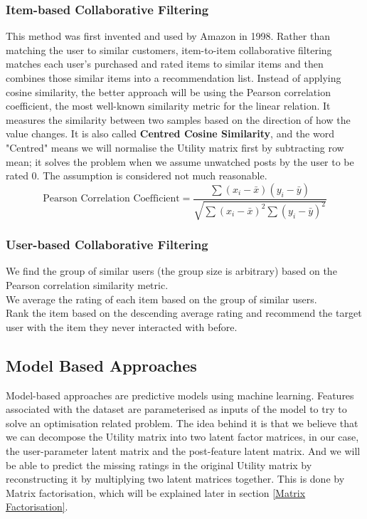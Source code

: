 \subsubsection{Item-based Collaborative Filtering}
This method was first invented and used by Amazon in 1998. 
Rather than matching the user to similar customers, item-to-item collaborative filtering matches each user’s purchased and rated items to similar items and then combines those similar items into a recommendation list.
Instead of applying cosine similarity, the better approach will be using the Pearson correlation coefficient, the most well-known similarity metric for the linear relation. It measures the similarity between two samples based on the direction of how the value changes. It is also called \textbf{Centred Cosine Similarity}, and the word "Centred" means we will normalise the Utility matrix first by subtracting row mean; it solves the problem when we assume unwatched posts by the user to be rated 0. The assumption is considered not much reasonable.
\begin{equation*}
\text{Pearson Correlation Coefficient} = \frac{\sum(x_{i} - \bar{x})(y_{i} - \bar{y})} {\sqrt{\sum(x_{i} - \bar{x})^{2} \sum{(y_{i} - \bar{y})^{2} }}}
\end{equation*}

\subsubsection{User-based Collaborative Filtering}
We find the group of similar users (the group size is arbitrary) based on the Pearson correlation similarity metric.
\\We average the rating of each item based on the group of similar users.
\\Rank the item based on the descending average rating and recommend the target user with the item they never interacted with before.

\subsection{Model Based Approaches}
Model-based approaches are predictive models using machine learning. Features associated with the dataset are parameterised as inputs of the model to try to solve an optimisation related problem. The idea behind it is that we believe that we can decompose the Utility matrix into two latent factor matrices, in our case, the user-parameter latent matrix and the post-feature latent matrix. And we will be able to predict the missing ratings in the original Utility matrix by reconstructing it by multiplying two latent matrices together. This is done by Matrix factorisation, which will be explained later in section \ref{Matrix Factorisation}.

